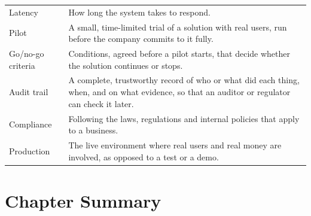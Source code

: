 \begin{xltabular}{\textwidth}{@{}>{\raggedright\arraybackslash}p{3.5cm}>{\raggedright\arraybackslash}X@{}}
Latency & How long the system takes to respond. \\
Pilot & A small, time-limited trial of a solution with real users, run before the company commits to it fully. \\
Go/no-go criteria & Conditions, agreed before a pilot starts, that decide whether the solution continues or stops. \\
Audit trail & A complete, trustworthy record of who or what did each thing, when, and on what evidence, so that an auditor or regulator can check it later. \\
Compliance & Following the laws, regulations and internal policies that apply to a business. \\
Production & The live environment where real users and real money are involved, as opposed to a test or a demo. \\
\bottomrule
\end{xltabular}
\endgroup

\section*{Chapter Summary}

